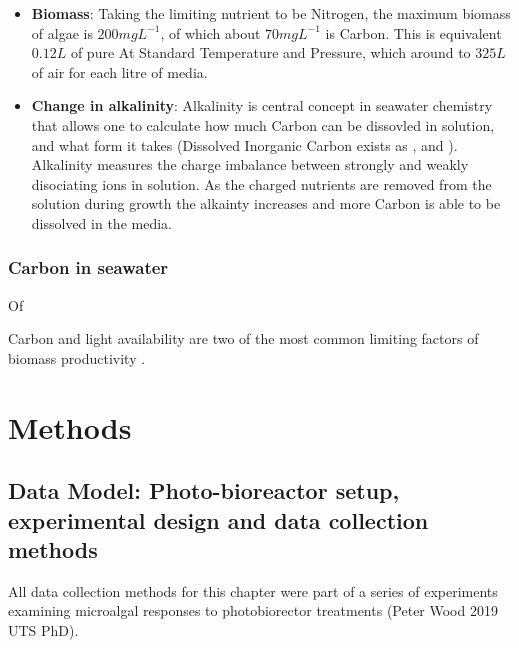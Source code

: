 \documentclass{ruthesis}
\begin{document}
\begin{itemize}
\item{\textbf{Biomass}:} Taking the limiting nutrient to be Nitrogen, the maximum biomass of algae is $200 mg L^{-1}$, of which about $70 mg L^{-1}$ is Carbon.  This is equivalent  $0.12 L$ of pure  At Standard Temperature and Pressure, which around to $325 L$ of air for each litre of media.

\item{\textbf{Change in alkalinity}:} Alkalinity is central concept in seawater chemistry that allows one to calculate how much Carbon can be dissovled in solution, and what form it takes (Dissolved Inorganic Carbon exists as ,  and ).  Alkalinity measures the charge imbalance between strongly and weakly disociating ions in solution.  As the charged nutrients are removed from the solution during growth the alkainty increases and more Carbon is able to be dissolved in the media.
\end{itemize}

\subsubsection{Carbon in seawater}
 Of
 
 

Carbon and light availability are two of the most common limiting factors of biomass productivity \cite{posten2009design}.








\section{Methods}

\subsection{Data Model: Photo-bioreactor setup, experimental design and data collection methods}\label{sec:micro_data_collection}

All data collection methods for this chapter were part of a series of experiments examining microalgal responses to photobiorector treatments (Peter Wood 2019 UTS PhD).
\end{document}
